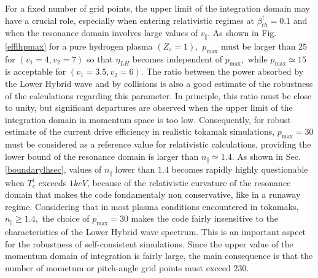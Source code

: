 For a fixed number of grid points, the upper limit of the integration domain
may have a crucial role, especially when entering relativistic regimes at $
\beta _{th}^{\dag }=0.1$ and when the resonance domain involves large values
of $v_{\Vert }$. As shown in Fig. \ref{efflhpmax} for a pure hydrogen plasma
$\left( Z_{s}=1\right) ,$ $p_{\max }$ must be larger than $25$ for $\left(
v_{1}=4,v_{2}=7\right) $ so that $\eta _{LH}$ becomes independent of $
p_{\max },$ while $p_{\max }\simeq 15$ is acceptable for $\left(
v_{1}=3.5,v_{2}=6\right) .$ The ratio between the power absorbed by the
Lower Hybrid wave and by collisions is also a good estimate of the
robustness of the calculations regarding this parameter. In principle, this
ratio must be close to unity, but significant departures are observed when
the upper limit of the integration domain in momentum space is too low.
Consequently, for robust estimate of the current drive efficiency in
realistic tokamak simulations, $p_{\max }=30$ must be considered as a
reference value for relativistic calculations, providing the lower bound of
the resonance domain is larger than $n_{\Vert }\simeq 1.4.$ As shown in Sec.
\ref{boundarylhsec}, values of $n_{\Vert }$ lower than $1.4$ becomes rapidly
highly questionable when $T_{e}^{\dagger }$ exceeds $1keV$, because of the
relativistic curvature of the resonance domain that makes the code
fondamentaly non conservative, like in a runaway regime. Considering that in
most plasma conditions encountered in tokamaks, $n_{\Vert }\geq 1.4,$ the
choice of $p_{\max }=30$ makes the code fairly insensitive to the
characteristics of the Lower Hybrid wave spectrum. This is an important
aspect for the robustness of self-consistent simulations. Since the upper
value of the momentum domain of integration is fairly large, the main
consequence is that the number of mometum or pitch-angle grid points must
exceed $230$.


